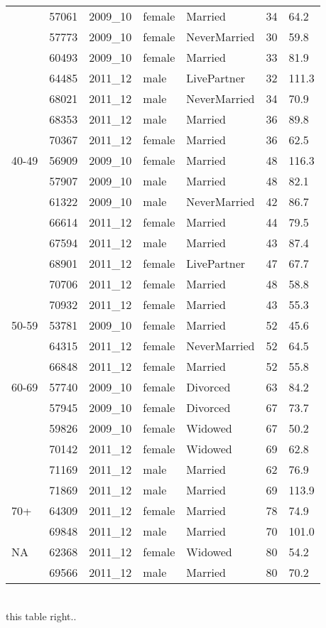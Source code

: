 \documentclass{article}
\begin{document}
\begin{table}[H]
\begin{tabular}{p{3cm}llllll}
 & 57061 & 2009\_10 & female & Married & 34 &  64.2 \\
 & 57773 & 2009\_10 & female & NeverMarried & 30 &  59.8 \\
 & 60493 & 2009\_10 & female & Married & 33 &  81.9 \\
 & 64485 & 2011\_12 & male & LivePartner & 32 & 111.3 \\
 & 68021 & 2011\_12 & male & NeverMarried & 34 &  70.9 \\
 & 68353 & 2011\_12 & male & Married & 36 &  89.8 \\
 & 70367 & 2011\_12 & female & Married & 36 &  62.5 \\
[2ex]
 40-49 & 56909 & 2009\_10 & female & Married & 48 & 116.3 \\
 & 57907 & 2009\_10 & male & Married & 48 &  82.1 \\
 & 61322 & 2009\_10 & male & NeverMarried & 42 &  86.7 \\
 & 66614 & 2011\_12 & female & Married & 44 &  79.5 \\
 & 67594 & 2011\_12 & male & Married & 43 &  87.4 \\
 & 68901 & 2011\_12 & female & LivePartner & 47 &  67.7 \\
 & 70706 & 2011\_12 & female & Married & 48 &  58.8 \\
 & 70932 & 2011\_12 & female & Married & 43 &  55.3 \\
[2ex]
 50-59 & 53781 & 2009\_10 & female & Married & 52 &  45.6 \\
 & 64315 & 2011\_12 & female & NeverMarried & 52 &  64.5 \\
 & 66848 & 2011\_12 & female & Married & 52 &  55.8 \\
[2ex]
 60-69 & 57740 & 2009\_10 & female & Divorced & 63 &  84.2 \\
 & 57945 & 2009\_10 & female & Divorced & 67 &  73.7 \\
 & 59826 & 2009\_10 & female & Widowed & 67 &  50.2 \\
 & 70142 & 2011\_12 & female & Widowed & 69 &  62.8 \\
 & 71169 & 2011\_12 & male & Married & 62 &  76.9 \\
 & 71869 & 2011\_12 & male & Married & 69 & 113.9 \\
[2ex]
 70+ & 64309 & 2011\_12 & female & Married & 78 &  74.9 \\
 & 69848 & 2011\_12 & male & Married & 70 & 101.0 \\
[2ex]
NA & 62368 & 2011\_12 & female & Widowed & 80 &  54.2 \\
 & 69566 & 2011\_12 & male & Married & 80 &  70.2 \\
[2ex]
\hline\end{tabular}\\
this table right..
\end{table}
\end{document}
